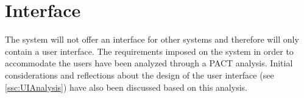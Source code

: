 \section{Interface}\label{sc:interface}
The system will not offer an interface for other systems and therefore will only contain a user interface. The requirements imposed on the system in order to accommodate the users have been analyzed through a PACT analysis. Initial considerations and reflections about the design of the user interface (see \autoref{ssc:UIAnalysis}) have also been discussed based on this analysis.